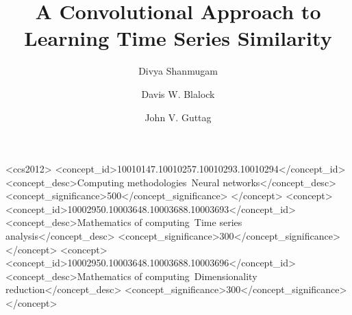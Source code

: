 \documentclass[sigconf]{acmart}
\begin{document}
%
\title{A Convolutional Approach to Learning Time Series Similarity}

\author{Divya Shanmugam}

\author{Davis W. Blalock}

\author{John V. Guttag}

\maketitle


\begin{CCSXML}
<ccs2012>
<concept_id>10010147.10010257.10010293.10010294</concept_id>
<concept_desc>Computing methodologies~Neural networks</concept_desc>
<concept_significance>500</concept_significance>
</concept>
<concept>
<concept_id>10002950.10003648.10003688.10003693</concept_id>
<concept_desc>Mathematics of computing~Time series analysis</concept_desc>
<concept_significance>300</concept_significance>
</concept>
<concept>
<concept_id>10002950.10003648.10003688.10003696</concept_id>
<concept_desc>Mathematics of computing~Dimensionality reduction</concept_desc>
<concept_significance>300</concept_significance>
</concept>
\end{CCSXML}
\end{document}
